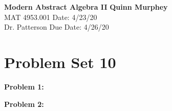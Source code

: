 \documentclass[letter paper, 12pt]{article}
\begin{document}
\noindent
\large\textbf{Modern Abstract Algebra II} \hfill \textbf{Quinn Murphey} \\
\normalsize MAT 4953.001 \hfill Date: 4/23/20 \\
Dr. Patterson \hfill Due Date: 4/26/20 \\
\noindent\makebox[\linewidth]{\rule{\paperwidth}{0.4pt}}

\section*{Problem Set 10}
\doublespacing
\noindent\textbf{Problem 1:}
    
    
    
    
    
\noindent\textbf{Problem 2:}
    
    
    
    
    
\end{document}
